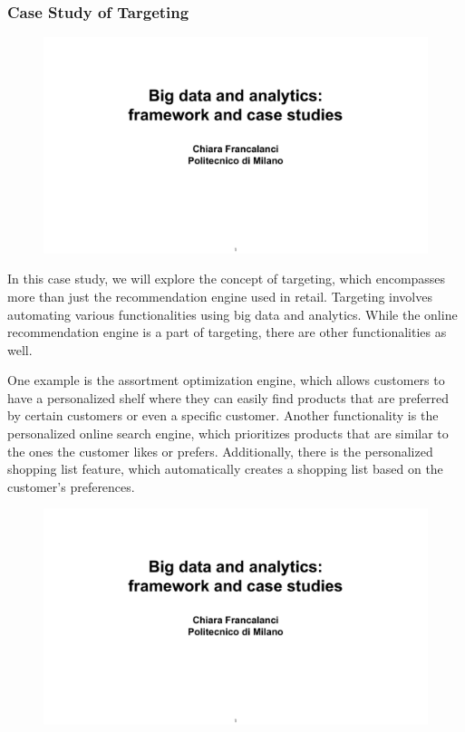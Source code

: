 \subsubsection{Case Study of Targeting}

\begin{figure}[!h]
    \centering
    \includegraphics[page=89, trim = 0cm 3cm 1.5cm 4.3cm, clip, width=\textwidth]{images/06 - BIG_DATA.pdf}
\end{figure}

In this case study, we will explore the concept of targeting, which
encompasses more than just the recommendation engine used in retail.
Targeting involves automating various functionalities using big data and
analytics. While the online recommendation engine is a part of
targeting, there are other functionalities as well.

One example is the assortment optimization engine, which allows
customers to have a personalized shelf where they can easily find
products that are preferred by certain customers or even a specific
customer. Another functionality is the personalized online search
engine, which prioritizes products that are similar to the ones the
customer likes or prefers. Additionally, there is the personalized
shopping list feature, which automatically creates a shopping list based
on the customer's preferences.

\begin{figure}[!h]
    \centering
    \includegraphics[page=95, trim = 1.5cm 3.5cm 1.5cm 4cm, clip, width=\textwidth]{images/06 - BIG_DATA.pdf}
\end{figure}

